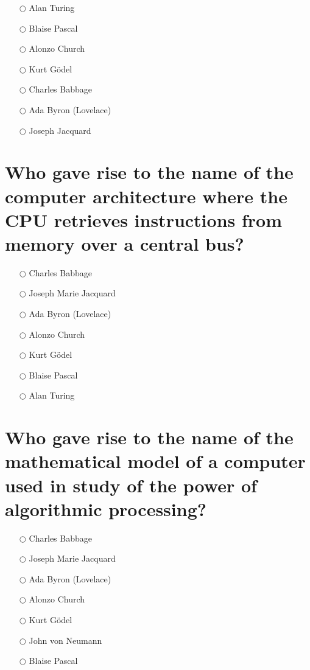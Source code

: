 \documentclass[a4paper,11pt,oneside]{book}
\begin{document}
\begin{sloppypar}
\label{q:439:mc:en:True}

\begin{itemize}
  \item[$\bigcirc$] Alan Turing
  \item[$\bigcirc$] Blaise Pascal
  \item[$\bigcirc$] Alonzo Church
  \item[$\bigcirc$] Kurt G\"odel
  \item[$\bigcirc$] Charles Babbage
  \item[$\bigcirc$] Ada Byron (Lovelace)
  \item[$\bigcirc$] Joseph Jacquard
\end{itemize}



\section{Who gave rise to the name of the computer architecture where the CPU retrieves instructions from memory over a central bus?}

\label{q:440:mc:en:True}

\begin{itemize}
  \item[$\bigcirc$] Charles Babbage
  \item[$\bigcirc$] Joseph Marie Jacquard
  \item[$\bigcirc$] Ada Byron (Lovelace)
  \item[$\bigcirc$] Alonzo Church
  \item[$\bigcirc$] Kurt G\"odel
  \item[$\bigcirc$] Blaise Pascal
  \item[$\bigcirc$] Alan Turing
\end{itemize}



\section{Who gave rise to the name of the mathematical model of a computer used in study of the power of algorithmic processing?}

\label{q:441:mc:en:True}

\begin{itemize}
  \item[$\bigcirc$] Charles Babbage
  \item[$\bigcirc$] Joseph Marie Jacquard
  \item[$\bigcirc$] Ada Byron (Lovelace)
  \item[$\bigcirc$] Alonzo Church
  \item[$\bigcirc$] Kurt G\"odel
  \item[$\bigcirc$] John von Neumann
  \item[$\bigcirc$] Blaise Pascal
\end{itemize}




\end{sloppypar}
\end{document}
